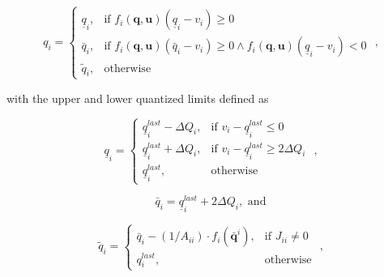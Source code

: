 \begin{equation}
    \label{eq:liqss_qfunc}
    q_i = 
    \begin{cases}
        
        \underline{q}_i, & \text{if } f_i \left( \mathbf{q}, \mathbf{u} \right) \left( \underline{q}_i - v_i \right) \geq 0 \\
        
        \bar{q}_i, & \text{if } f_i \left( \mathbf{q}, \mathbf{u} \right) \left( \bar{q}_i - v_i \right) \geq 0 \wedge f_i \left( \mathbf{q}, \mathbf{u} \right) \left( \underline{q}_i - v_i \right) < 0\\
        
        \tilde{q}_i, & \text{otherwise}
        
    \end{cases} \text{   ,} 
\end{equation}

\noindent with the upper and lower quantized limits defined as

\begin{equation}
    \label{eq:liqss_qlow}
    \underline{q}_i = 
    \begin{cases}
        
        \underline{q}_i^{last}-\Delta Q_i, & \text{if } v_i-\underline{q}_i^{last} \leq 0 \\
        
        \underline{q}_i^{last}+\Delta Q_i, & \text{if } v_i-\underline{q}_i^{last} \geq 2 \Delta Q_i \\
        
        \underline{q}_i^{last}, & \text{otherwise}
        
    \end{cases} \text{   ,} 
\end{equation}

\begin{equation}
    \label{eq:liqss_qhigh}  
    \bar{q}_i = \underline{q}_i^{last} + 2 \Delta Q_i, \text{ and}
\end{equation}

\begin{equation} \label{eq:liqss_qtilde}  
    \tilde{q}_i = 
    \begin{cases}
        
        \bar{q}_i - (1/A_{ii}) \cdot f_i \left( \bar{\mathbf{q}}^i \right), & \text{if } J_{ii} \ne 0 \\
        
        q_i^{last}, & \text{otherwise}
        
    \end{cases}  \text{   ,} 
\end{equation}

